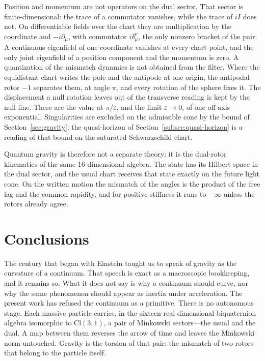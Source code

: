 \documentclass[a4paper]{article}
\begin{document}
Position and momentum are not operators on the dual sector. That sector is finite-dimensional: the trace of a commutator vanishes, while the trace of $iI$ does not. On differentiable fields over the chart they are multiplication by the coordinate and $-i\partial_\mu$, with commutator $i\delta^\nu_\mu$, the only nonzero bracket of the pair. A continuous eigenfield of one coordinate vanishes at every chart point, and the only joint eigenfield of a position component and the momentum is zero. A quantization of the mismatch dynamics is not obtained from the filter. Where the equidistant chart writes the pole and the antipode at one origin, the antipodal rotor $-1$ separates them, at angle $\pi$, and every rotation of the sphere fixes it. The displacement a null rotation leaves out of the transverse reading is kept by the null line. These are the value at $\pi/\varepsilon$, and the limit $\varepsilon\to 0$, of one off-axis exponential. Singularities are excluded on the admissible cone by the bound of Section~\ref{sec:gravity}; the quasi-horizon of Section~\ref{subsec:quasi-horizon} is a reading of that bound on the saturated Schwarzschild chart.

Quantum gravity is therefore not a separate theory: it is the dual-rotor kinematics of the same 16-dimensional algebra. The state has its Hilbert space in the dual sector, and the usual chart receives that state exactly on the future light cone. On the written motion the mismatch of the angles is the product of the free lag and the common rapidity, and for positive stiffness it runs to $-\infty$ unless the rotors already agree.

\section{Conclusions}
\label{sec:conclusions}

The century that began with Einstein taught us to speak of gravity as the curvature of a continuum. That speech is exact as a macroscopic bookkeeping, and it remains so. What it does not say is why a continuum should curve, nor why the same phenomenon should appear as inertia under acceleration. The present work has refused the continuum as a primitive. There is no autonomous stage. Each massive particle carries, in the sixteen-real-dimensional biquaternion algebra isomorphic to $\mathrm{Cl}(3,1)$, a pair of Minkowski sectors---the usual and the dual. A map between them reverses the arrow of time and leaves the Minkowski norm untouched. Gravity is the torsion of that pair: the mismatch of two rotors that belong to the particle itself.
\end{document}
